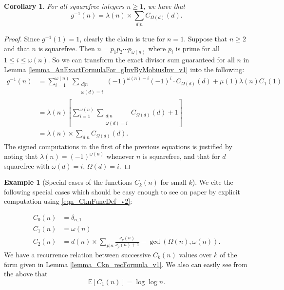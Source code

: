 \documentclass[11pt,reqno,a4letter]{article}
\numberwithin{figure}{section}
\numberwithin{table}{section}
\theoremstyle{plain}
\newtheorem{cor}[theorem]{Corollary}
\numberwithin{theorem}{section}
\theoremstyle{definition}
\newtheorem{example}[theorem]{Example}
\newcommand{\NBRef}[1]{}
\begin{document}
\begin{cor} 
\label{cor_AnExactFormulaFor_gInvByMobiusInv_nSqFree_v2} 
For all squarefree integers $n \geq 1$, we have that 
\[
g^{-1}(n) = \lambda(n) \times \sum_{d|n} C_{\Omega(d)}(d). 
\]
\end{cor} 
\begin{proof} 
Since $g^{-1}(1) = 1$, clearly the claim is true for $n = 1$. Suppose that $n \geq 2$ and that 
$n$ is squarefree. Then $n = p_1p_2 \cdots p_{\omega(n)}$ where $p_i$ is prime for all 
$1 \leq i \leq \omega(n)$. So we can transform the exact divisor sum guaranteed for all $n$ in 
Lemma \ref{lemma_AnExactFormulaFor_gInvByMobiusInv_v1} into the following: 
\begin{align*} 
g^{-1}(n) & = \sum_{i=1}^{\omega(n)} \sum_{\substack{d|n \\ \omega(d)=i}} (-1)^{\omega(n) - i} (-1)^{i} \cdot 
     C_{\Omega(d)}(d) + \mu(1) \lambda(n) C_1(1) \\ 
     & = \lambda(n) \left[\sum_{i=1}^{\omega(n)} \sum_{\substack{d|n \\ \omega(d)=i}} C_{\Omega(d)}(d) + 1\right] \\ 
     & = \lambda(n) \times \sum_{d|n} C_{\Omega(d)}(d). 
\end{align*} 
The signed computations in the first of the previous equations is justified by noting that $\lambda(n) = (-1)^{\omega(n)}$ 
whenever $n$ is squarefree, and that for $d$ squarefree with $\omega(d) = i$, $\Omega(d) = i$. 
\end{proof} 

\begin{example}[Special cases of the functions $C_k(n)$ for small $k$] 
\label{example_SpCase_Ckn} 
We cite the following special cases which should be easy enough to see on paper by 
explicit computation using \eqref{eqn_CknFuncDef_v2}: 
\NBRef{A07-2020-04-26} 
\begin{align*} 
C_0(n) & = \delta_{n,1} \\ 
C_1(n) & = \omega(n) \\ 
C_2(n) & = d(n) \times \sum_{p|n} \frac{\nu_p(n)}{\nu_p(n)+1} - \gcd\left(\Omega(n), \omega(n)\right). 
\end{align*} 
We have a recurrence relation between successive $C_k(n)$ values over $k$ of the form 
given in Lemma \ref{lemma_Ckn_recFormula_v1}. 
We also can easily see from the above that 
\[
\mathbb{E}[C_1(n)] = \log\log n.
\]
\end{example} 
\end{document}
